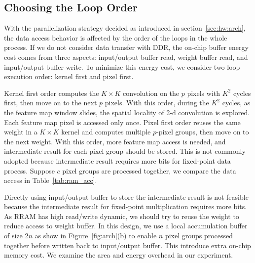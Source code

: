 \subsection{Choosing the Loop Order}
With the parallelization strategy decided as introduced in section~\ref{sec:hw:arch}, the data access behavior is affected by the order of the loops in the whole process. If we do not consider data transfer with DDR, the on-chip buffer energy cost comes from three aspects: input/output buffer read, weight buffer read, and input/output buffer write. To minimize this energy cost, we consider two loop execution order: kernel first and pixel first.

Kernel first order computes the $K\times K$ convolution on the $p$ pixels with $K^2$ cycles first, then move on to the next $p$ pixels. With this order, during the $K^2$ cycles, as the feature map window slides, the spatial locality of 2-d convolution is explored. Each feature map pixel is accessed only once. Pixel first order reuses the same weight in a $K\times K$ kernel and computes multiple $p$-pixel groups, then move on to the next weight. With this order, more feature map access is needed, and intermediate result for each pixel group should be stored. This is not commonly adopted because intermediate result requires more bits for fixed-point data process. Suppose $c$ pixel groups are processed together, we compare the data access in Table~\ref{tab:ram_acc}. 



Directly using input/output buffer to store the intermediate result is not feasible because the intermediate result for fixed-point multiplication requires more bits. As RRAM has high read/write dynamic, we should try to reuse the weight to reduce access to weight buffer. In this design, we use a local accumulation buffer of size $2n$ as show in Figure~\ref{fig:arch}(b) to enable $n$ pixel groups processed together before written back to input/output buffer. This introduce extra on-chip memory cost. We examine the area and energy overhead in our experiment.